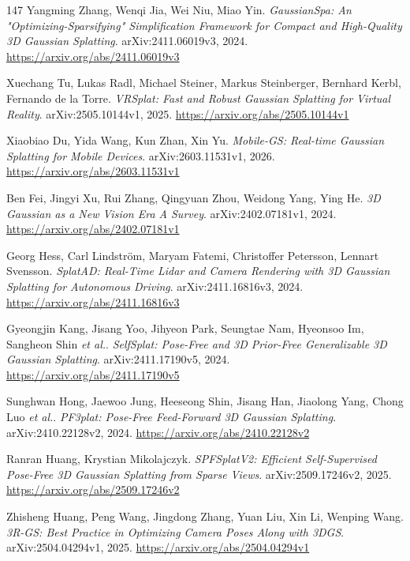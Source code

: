 \documentclass[11pt,a4paper]{article}
\begin{document}
\begin{thebibliography}{147}
Yangming Zhang, Wenqi Jia, Wei Niu, Miao Yin.
\newblock \emph{GaussianSpa: An "Optimizing-Sparsifying" Simplification Framework for Compact and High-Quality 3D Gaussian Splatting}.
\newblock arXiv:2411.06019v3, 2024.
\newblock \url{https://arxiv.org/abs/2411.06019v3}

Xuechang Tu, Lukas Radl, Michael Steiner, Markus Steinberger, Bernhard Kerbl, Fernando de la Torre.
\newblock \emph{VRSplat: Fast and Robust Gaussian Splatting for Virtual Reality}.
\newblock arXiv:2505.10144v1, 2025.
\newblock \url{https://arxiv.org/abs/2505.10144v1}

Xiaobiao Du, Yida Wang, Kun Zhan, Xin Yu.
\newblock \emph{Mobile-GS: Real-time Gaussian Splatting for Mobile Devices}.
\newblock arXiv:2603.11531v1, 2026.
\newblock \url{https://arxiv.org/abs/2603.11531v1}

Ben Fei, Jingyi Xu, Rui Zhang, Qingyuan Zhou, Weidong Yang, Ying He.
\newblock \emph{3D Gaussian as a New Vision Era A Survey}.
\newblock arXiv:2402.07181v1, 2024.
\newblock \url{https://arxiv.org/abs/2402.07181v1}

Georg Hess, Carl Lindstr\"{o}m, Maryam Fatemi, Christoffer Petersson, Lennart Svensson.
\newblock \emph{SplatAD: Real-Time Lidar and Camera Rendering with 3D Gaussian Splatting for Autonomous Driving}.
\newblock arXiv:2411.16816v3, 2024.
\newblock \url{https://arxiv.org/abs/2411.16816v3}

Gyeongjin Kang, Jisang Yoo, Jihyeon Park, Seungtae Nam, Hyeonsoo Im, Sangheon Shin \emph{et al.}.
\newblock \emph{SelfSplat: Pose-Free and 3D Prior-Free Generalizable 3D Gaussian Splatting}.
\newblock arXiv:2411.17190v5, 2024.
\newblock \url{https://arxiv.org/abs/2411.17190v5}

Sunghwan Hong, Jaewoo Jung, Heeseong Shin, Jisang Han, Jiaolong Yang, Chong Luo \emph{et al.}.
\newblock \emph{PF3plat: Pose-Free Feed-Forward 3D Gaussian Splatting}.
\newblock arXiv:2410.22128v2, 2024.
\newblock \url{https://arxiv.org/abs/2410.22128v2}

Ranran Huang, Krystian Mikolajczyk.
\newblock \emph{SPFSplatV2: Efficient Self-Supervised Pose-Free 3D Gaussian Splatting from Sparse Views}.
\newblock arXiv:2509.17246v2, 2025.
\newblock \url{https://arxiv.org/abs/2509.17246v2}

Zhisheng Huang, Peng Wang, Jingdong Zhang, Yuan Liu, Xin Li, Wenping Wang.
\newblock \emph{3R-GS: Best Practice in Optimizing Camera Poses Along with 3DGS}.
\newblock arXiv:2504.04294v1, 2025.
\newblock \url{https://arxiv.org/abs/2504.04294v1}


\end{thebibliography}
\end{document}
